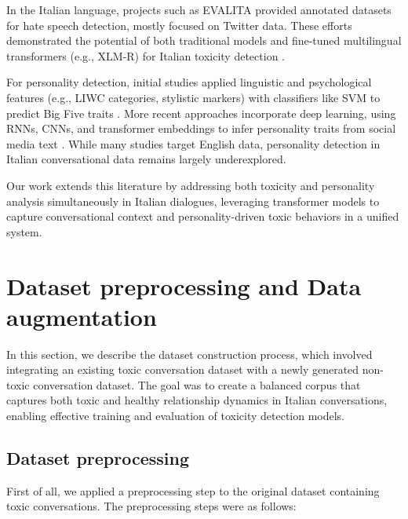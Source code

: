 \documentclass[conference]{IEEEtran}
\begin{document}
In the Italian language, projects such as EVALITA \cite{EVALITA2018} provided annotated datasets for hate speech detection, mostly focused on Twitter data. These efforts demonstrated the potential of both traditional models and fine-tuned multilingual transformers (e.g., XLM-R) for Italian toxicity detection \cite{ResourcesBenchmarkHateSpeech2021}.

For personality detection, initial studies applied linguistic and psychological features (e.g., LIWC categories, stylistic markers) with classifiers like SVM to predict Big Five traits \cite{PersonalityRecognitionConversationText2007} \cite{WhoseThumb2006}. More recent approaches incorporate deep learning, using RNNs, CNNs, and transformer embeddings to infer personality traits from social media text \cite{PersonalityTraitDetectionBERT2020}. While many studies target English data, personality detection in Italian conversational data remains largely underexplored.

Our work extends this literature by addressing both toxicity and personality analysis simultaneously in Italian dialogues, leveraging transformer models to capture conversational context and personality-driven toxic behaviors in a unified system.

\section{Dataset preprocessing and Data augmentation}

In this section, we describe the dataset construction process, which involved integrating an existing toxic conversation dataset with a newly generated non-toxic conversation dataset. The goal was to create a balanced corpus that captures both toxic and healthy relationship dynamics in Italian conversations, enabling effective training and evaluation of toxicity detection models.

\subsection{Dataset preprocessing}

First of all, we applied a preprocessing step to the original dataset containing toxic conversations. The preprocessing steps were as follows:
\end{document}
